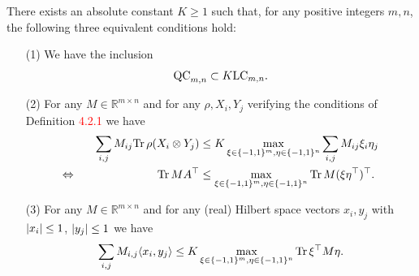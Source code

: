 	\begin{theo}
		There exists an absolute constant $K\geq 1$ such that, for any positive integers $m,n$, the following three equivalent conditions hold:
		\begin{itemize}
			\item[(1)] We have the inclusion 
				\begin{equation}
					\textup{QC}_{m,n} \subset K\textup{LC}_{m,n}.
				\end{equation}
			\item[(2)] For any $M\in\mathbb{R}^{m\times n}$ and for any $\rho,X_i,Y_j$ verifying the conditions of Definition \textcolor{red}{4.2.1} we have
				\begin{align}
					\sum_{i,j} M_{ij} \textup{Tr} \, {\rho(X_i\otimes Y_j)}  &\leq K \max_{\xi\in\{-1,1\}^m,\eta\in\{-1,1\}^n} \sum_{i,j} M_{ij}\xi_i\eta_j \\
					\Leftrightarrow \hspace{2.5cm} \textup{Tr} \, {MA^\top}  &\leq \max_{\xi\in\{-1,1\}^m,\eta\in\{-1,1\}^n} \textup{Tr} \, {M(\xi\eta^\top)^\top} .
				\end{align}
				\item[(3)] For any $M\in\mathbb{R}^{m\times n}$ and for any (real) Hilbert space vectors $x_i,y_j$ with ${\left|{x_i}\right|}\leq 1$, ${\left|{y_j}\right|}\leq 1$ we have
					\begin{equation}
						\sum_{i,j} M_{i,j}\langle{x_i},{y_j}\rangle \leq K \max_{\xi\in\{-1,1\}^m,\eta\in\{-1,1\}^n} \textup{Tr} \, {\xi^\top M \eta} . \label{eq:G_ineq}
					\end{equation}
		\end{itemize}
	\end{theo}
